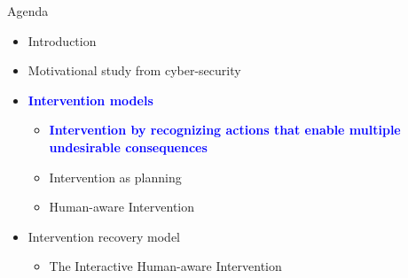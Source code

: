 \begin{frame}{Agenda}
\begin{itemize}
\item Introduction
\item Motivational study from cyber-security
\item \textcolor{blue} {\textbf{Intervention models}}
\begin{itemize}
\item \textcolor{blue} {\textbf{Intervention by recognizing actions that enable multiple undesirable consequences}}
\item Intervention as planning
\item Human-aware Intervention
\end{itemize}
\item Intervention recovery model
\begin{itemize}
\item The Interactive Human-aware Intervention
\end{itemize}
\end{itemize}

\end{frame}